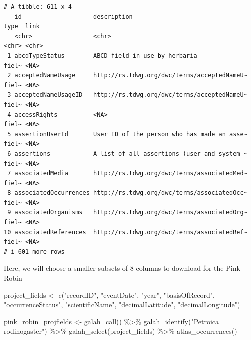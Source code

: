 \documentclass[
  letterpaper,
  DIV=11,
  numbers=noendperiod,
  oneside]{scrreprt}
\newenvironment{Shaded}{\begin{snugshade}}{\end{snugshade}}
\newcommand{\FunctionTok}[1]{\textcolor[rgb]{0.28,0.35,0.67}{#1}}
\newcommand{\NormalTok}[1]{\textcolor[rgb]{0.00,0.23,0.31}{#1}}
\newcommand{\OtherTok}[1]{\textcolor[rgb]{0.00,0.23,0.31}{#1}}
\newcommand{\SpecialCharTok}[1]{\textcolor[rgb]{0.37,0.37,0.37}{#1}}
\newcommand{\StringTok}[1]{\textcolor[rgb]{0.13,0.47,0.30}{#1}}
\begin{document}
\begin{verbatim}
# A tibble: 611 x 4
   id                    description                                 type  link 
   <chr>                 <chr>                                       <chr> <chr>
 1 abcdTypeStatus        ABCD field in use by herbaria               fiel~ <NA> 
 2 acceptedNameUsage     http://rs.tdwg.org/dwc/terms/acceptedNameU~ fiel~ <NA> 
 3 acceptedNameUsageID   http://rs.tdwg.org/dwc/terms/acceptedNameU~ fiel~ <NA> 
 4 accessRights          <NA>                                        fiel~ <NA> 
 5 assertionUserId       User ID of the person who has made an asse~ fiel~ <NA> 
 6 assertions            A list of all assertions (user and system ~ fiel~ <NA> 
 7 associatedMedia       http://rs.tdwg.org/dwc/terms/associatedMed~ fiel~ <NA> 
 8 associatedOccurrences http://rs.tdwg.org/dwc/terms/associatedOcc~ fiel~ <NA> 
 9 associatedOrganisms   http://rs.tdwg.org/dwc/terms/associatedOrg~ fiel~ <NA> 
10 associatedReferences  http://rs.tdwg.org/dwc/terms/associatedRef~ fiel~ <NA> 
# i 601 more rows
\end{verbatim}

Here, we will choose a smaller subsets of 8 columns to download for the
Pink Robin

\begin{Shaded}
\begin{Highlighting}[]
\NormalTok{project\_fields }\OtherTok{\textless{}{-}} \FunctionTok{c}\NormalTok{(}\StringTok{"recordID"}\NormalTok{,}
                    \StringTok{"eventDate"}\NormalTok{,}
                    \StringTok{"year"}\NormalTok{, }
                    \StringTok{"basisOfRecord"}\NormalTok{, }
                    \StringTok{"occurrenceStatus"}\NormalTok{,}
                    \StringTok{"scientificName"}\NormalTok{,}
                    \StringTok{"decimalLatitude"}\NormalTok{,}
                    \StringTok{"decimalLongitude"}\NormalTok{)}

\NormalTok{pink\_robin\_projfields }\OtherTok{\textless{}{-}} \FunctionTok{galah\_call}\NormalTok{() }\SpecialCharTok{\%\textgreater{}\%} 
  \FunctionTok{galah\_identify}\NormalTok{(}\StringTok{"Petroica rodinogaster"}\NormalTok{) }\SpecialCharTok{\%\textgreater{}\%} 
  \FunctionTok{galah\_select}\NormalTok{(project\_fields) }\SpecialCharTok{\%\textgreater{}\%} 
  \FunctionTok{atlas\_occurrences}\NormalTok{()}
\end{Highlighting}
\end{Shaded}
\end{document}
